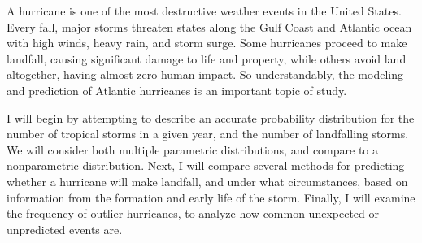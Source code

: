 
\par
A hurricane is one of the most destructive weather events in the United States.
Every fall, major storms threaten states along the Gulf Coast and Atlantic ocean with high winds, heavy rain, and storm surge.
Some hurricanes proceed to make landfall, causing significant damage to life and property, while others avoid land altogether, having almost zero human impact.
So understandably, the modeling and prediction of Atlantic hurricanes is an important topic of study.

\par
I will begin by attempting to describe an accurate probability distribution for the number of tropical storms in a given year, and the number of landfalling storms. We will consider both multiple parametric distributions, and compare to a nonparametric distribution.
Next, I will compare several methods for predicting whether a hurricane will make landfall, and under what circumstances, based on information from the formation and early life of the storm.
Finally, I will examine the frequency of outlier hurricanes, to analyze how common unexpected or unpredicted events are.